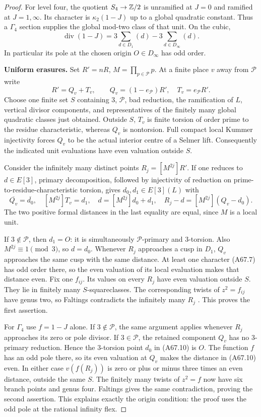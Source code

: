 \begin{proof}
For level four, the quotient
$S_4\to\mathbb Z/2$ is unramified at $J=0$
and ramified at $J=1,\infty$.
Its character is
$\kappa_2(1-J)$ up to a global
quadratic constant. Thus a
$\Gamma_4$ section supplies the
global mod-two class of that unit.
On the cubic,
\[
 \operatorname{div}(1-J)
       =3\sum_{d\in D_1}(d)
          -3\sum_{d\in D_\infty}(d).
 \tag{A67.8}
\]
In particular its pole at the chosen
origin $O\in D_\infty$ has odd order.

\par\smallskip\noindent\textbf{Uniform erasures.}\enspace 
Set $R'=nR$, $M=\prod_{p\in\mathcal P}p$.
At a finite place $v$ away from
$\mathcal P$ write
\[
 R'=Q_v+T_v,\qquad
 Q_v=(1-e_{\mathcal P})R',\quad
 T_v=e_{\mathcal P}R'.
 \tag{A67.9}
\]
Choose one finite set $S$ containing
$3$, $\mathcal P$, bad reduction,
the ramification of $L$, vertical
divisor components, and representatives
of the finitely many global quadratic
classes just obtained. Outside $S$,
$T_v$ is finite torsion of order
prime to the residue characteristic,
whereas $Q_v$ is nontorsion. Full
compact local Kummer injectivity
forces $Q_v$ to be the actual
interior centre of a Selmer lift.
Consequently the indicated unit
evaluations have even valuation
outside $S$.

Consider the infinitely many distinct
points $R_j=[M^{2j}]R'$. If one reduces
to $d\in E[3]$, primary decomposition,
followed by injectivity of reduction
on prime-to-residue-characteristic
torsion, gives $d_0,d_1\in E[3](L)$
with
\[
 \overline{Q_v}=\overline{d_0},\quad
 [M^{2j}]T_v=d_1,\quad
 d=[M^{2j}]d_0+d_1,\quad
 R_j-d=[M^{2j}](Q_v-d_0).
 \tag{A67.10}
\]
The two positive formal distances
in the last equality are equal,
since $M$ is a local unit.

If $3\notin\mathcal P$, then $d_1=O$:
it is simultaneously
$\mathcal P$-primary and $3$-torsion.
Also $M^{2j}\equiv1\pmod3$, so
$d=d_0$. Whenever $R_j$ approaches
a cusp in $D_1$, $Q_v$ approaches
the same cusp with the same distance.
At least one character (A67.7)
has odd order there, so the even
valuation of its local evaluation
makes that distance even.
Fix one $f_{ij}$. Its values on
every $R_j$ have even valuation
outside $S$. They lie in finitely
many $S$-squareclasses. The
corresponding twists of
$z^2=f_{ij}$ have genus two, so
Faltings contradicts the infinitely
many $R_j$
\citep[Satz~7, p.~365, with the correction]{AMFaltings1983,AMFaltings1984Erratum}.
This proves the first assertion.

For $\Gamma_4$ use $f=1-J$ alone.
If $3\notin\mathcal P$, the same
argument applies whenever $R_j$
approaches its zero or pole divisor.
If $3\in\mathcal P$, the retained
component $Q_v$ has no $3$-primary
reduction. Hence the $3$-torsion
point $d_0$ in (A67.10) is $O$.
The function $f$ has an odd pole
there, so its even valuation at
$Q_v$ makes the distance in
(A67.10) even. In either case
$v(f(R_j))$ is zero or plus or
minus three times an even
distance, outside the same $S$.
The finitely many twists of
$z^2=f$ now have six branch
points and genus four.
Faltings gives the same
contradiction, proving the
second assertion. This explains
exactly the origin condition:
the proof uses the odd pole at
the rational infinity flex.


\end{proof}
